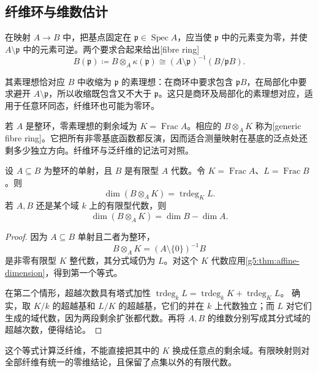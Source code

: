 \subsection{纤维环与维数估计}
\label{g5:subsec:0304:04}

在映射 \(A\rightarrow B\) 中，把基点固定在 \(\mathfrak p\in\operatorname{Spec}A\)，应当使 \(\mathfrak p\) 中的元素变为零，并使 \(A\setminus\mathfrak p\) 中的元素可逆。两个要求合起来给出[fibre ring]
\[
	B(\mathfrak p)\coloneqq B\otimes_A\kappa(\mathfrak p)
	\cong (A\setminus\mathfrak p)^{-1}(B/\mathfrak pB).
\]

其素理想恰对应 \(B\) 中收缩为 \(\mathfrak p\) 的素理想：在商环中要求包含 \(\mathfrak pB\)，在局部化中要求避开 \(A\setminus\mathfrak p\)，所以收缩既包含又不大于 \(\mathfrak p\)。这只是商环及局部化的素理想对应，适用于任意环同态，纤维环也可能为零环。

\ProseParagraphBreak

若 \(A\) 是整环，零素理想的剩余域为 \(K=\operatorname{Frac}A\)。相应的 \(B\otimes_AK\) 称为[generic fibre ring]。它把所有非零基底函数都反演，因而适合测量映射在基底的泛点处还剩多少独立方向。纤维环与泛纤维的记法可对照\cite[第15节，Fibres，第116页]{Matsumura1989}。

\begin{proposition}
\label{g5:prop:generic-fiber-dimension}
	设 \(A\subseteq B\) 为整环的单射，且 \(B\) 是有限型 \(A\) 代数。令 \(K=\operatorname{Frac}A\)、\(L=\operatorname{Frac}B\)。则
	\[
		\dim(B\otimes_AK)=\operatorname{trdeg}_K L.
	\]
	若 \(A,B\) 还是某个域 \(k\) 上的有限型代数，则
	\[
		\dim(B\otimes_AK)=\dim B-\dim A.
	\]
\end{proposition}
\begin{proof}
	因为 \(A\subseteq B\) 单射且二者为整环，
	\[
		B\otimes_AK=(A\setminus\{0\})^{-1}B
	\]
	是非零有限型 \(K\) 整代数，其分式域仍为 \(L\)。对这个 \(K\) 代数应用\cref{g5:thm:affine-dimension}，得到第一个等式。

	在第二个情形，超越次数具有塔式加性
	\(\operatorname{trdeg}_kL=\operatorname{trdeg}_kK+\operatorname{trdeg}_K L\)。
	确实，取 \(K/k\) 的超越基和 \(L/K\) 的超越基，它们的并在 \(k\) 上代数独立；而 \(L\) 对它们生成的域代数，因为两段剩余扩张都代数。再将 \(A,B\) 的维数分别写成其分式域的超越次数，便得结论。
\end{proof}

这个等式计算泛纤维，不能直接把其中的 \(K\) 换成任意点的剩余域。有限映射则对全部纤维有统一的零维结论，且保留了点集以外的有限代数。

